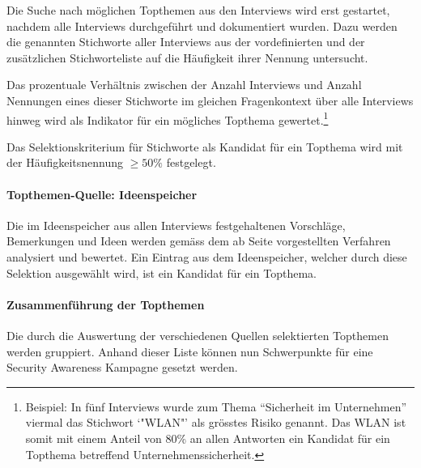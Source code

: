 \documentclass[../../main.tex]{subfiles}
\begin{document}
\begin{sloppypar}
Die Suche nach möglichen Topthemen aus den Interviews wird erst gestartet, nachdem alle Interviews durchgeführt und dokumentiert wurden. Dazu werden die genannten Stichworte aller Interviews aus der vordefinierten und der zusätzlichen Stichworteliste auf die Häufigkeit ihrer Nennung untersucht.

Das prozentuale Verhältnis zwischen der Anzahl Interviews und Anzahl Nennungen eines dieser Stichworte im gleichen Fragenkontext über alle Interviews hinweg wird als Indikator für ein mögliches Topthema gewertet.\footnote{Beispiel: In fünf Interviews wurde zum Thema "`Sicherheit im Unternehmen"' viermal das Stichwort `"WLAN"' als grösstes Risiko genannt. Das WLAN ist somit mit einem Anteil von 80\% an allen Antworten ein Kandidat für ein Topthema betreffend Unternehmenssicherheit.}

Das Selektionskriterium für Stichworte als Kandidat für ein Topthema wird mit der Häufigkeitsnennung $\ge  50\%$ festgelegt.
\end{sloppypar}

\paragraph*{Topthemen-Quelle: Ideenspeicher}\mbox{}

\begin{sloppypar}
Die im Ideenspeicher aus allen Interviews festgehaltenen Vorschläge, Bemerkungen und Ideen werden gemäss dem ab Seite \pageref{auswertung_interview} vorgestellten Verfahren analysiert und bewertet. Ein Eintrag aus dem Ideenspeicher, welcher durch diese Selektion ausgewählt wird, ist ein Kandidat für ein Topthema. 
\end{sloppypar}

\paragraph*{Zusammenführung der Topthemen}\mbox{}

\begin{sloppypar}
Die durch die Auswertung der verschiedenen Quellen selektierten Topthemen werden gruppiert. Anhand dieser Liste können nun Schwerpunkte für eine Security Awareness Kampagne gesetzt werden.
\end{sloppypar}
\end{document}
